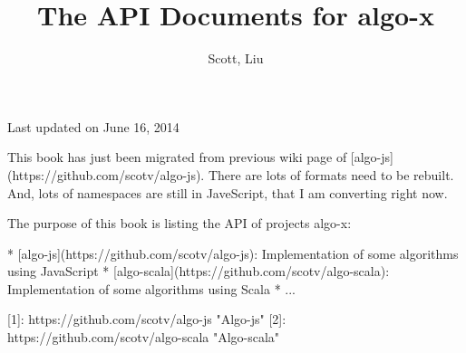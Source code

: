 \documentclass{article}
\title{The API Documents for algo-x}
\author{Scott, Liu}
\begin{document}
\maketitle
\date{}
Last updated on June 16, 2014

This book has just been migrated from previous wiki page of [algo-js](https://github.com/scotv/algo-js). There are lots of formats need to be rebuilt. And, lots of namespaces are still in JaveScript, that I am converting right now.

The purpose of this book is listing the API of projects algo-x:

*  [algo-js](https://github.com/scotv/algo-js): Implementation of some algorithms using JavaScript
*  [algo-scala](https://github.com/scotv/algo-scala): Implementation of some algorithms using Scala
*  ...


[1]: https://github.com/scotv/algo-js		"Algo-js"
[2]: https://github.com/scotv/algo-scala	"Algo-scala"


\end{document}
